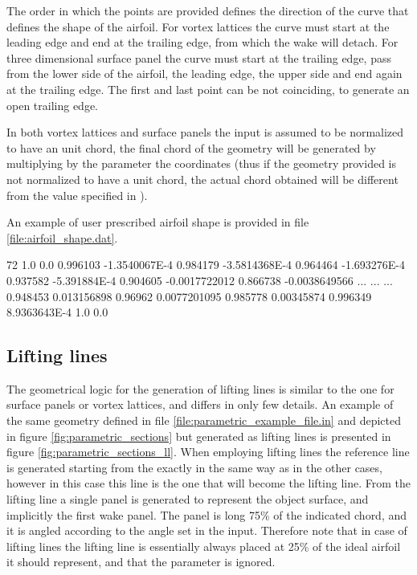 The order in which the points are provided defines the direction of the curve that 
defines the shape of the airfoil. For vortex lattices the curve must start at the 
leading edge and end at the trailing edge, from which the wake will detach. 
For three dimensional surface panel the curve must start at the trailing edge, 
pass from the lower side of the airfoil, the leading edge, the upper side and end 
again at the trailing edge. The first and last point can be not coinciding, 
to generate an open trailing edge. 

In both vortex lattices and surface panels the input is assumed to be normalized 
to have an unit chord, the final chord of the geometry will be generated by 
multiplying by the  parameter the coordinates 
(thus if the geometry provided is not normalized to have a unit chord, 
the actual chord obtained will be different from the value specified in ).

An example of user prescribed airfoil shape is provided in file \ref{file:airfoil_shape.dat}.

\begin{inputfile}[frame=single, caption={Example of user specified airfoil shape 
  (the middle lines have been suppressed for brevity)}, label={file:airfoil_shape.dat}]
72
1.0      0.0   
0.996103      -1.3540067E-4   
0.984179      -3.5814368E-4   
0.964464      -1.693276E-4   
0.937582      -5.391884E-4   
0.904605      -0.0017722012   
0.866738      -0.0038649566   
...
...
...
0.948453      0.013156898   
0.96962      0.0077201095   
0.985778      0.00345874   
0.996349      8.9363643E-4   
1.0      0.0   
\end{inputfile}

\subsection{Lifting lines}

The geometrical logic for the generation of lifting lines is similar to the one for surface panels 
or vortex lattices, and differs in only few details. An example of the same geometry defined in 
file \ref{file:parametric_example_file.in} and depicted in figure \ref{fig:parametric_sections} 
but generated as lifting lines is presented in figure \ref{fig:parametric_sections_ll}. 
When employing lifting lines the reference line is generated starting from the 
 exactly in the same way as in the other cases, however 
in this case this line is the one that will become the lifting line. From the lifting 
line a single panel is generated to represent the object surface, and implicitly the 
first wake panel. The panel is long 75\% of the indicated chord, and it is angled according 
to the  angle set in the input. Therefore note that in case of lifting lines the 
lifting line is essentially always placed at 25\% of the ideal airfoil it should represent, 
and that the parameter  is ignored. 

